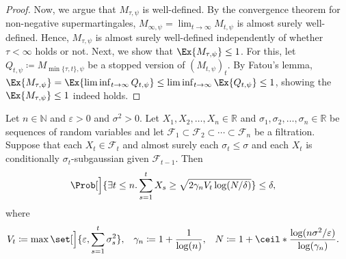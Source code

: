 \documentclass{article}
\newcommand{\defeq}{\coloneq}
\newcommand{\Real}{\mathds{R}}
\newcommand{\Nat}{\mathds{N}}
\DeclarePairedDelimiter{\ceil}\lceil\rceil
\begin{document}
\begin{lemma}
\begin{proof}
    Now, we argue that $M_{\tau,\psi}$ is well-defined.  By the
    convergence theorem for non-negative supermartingales,
    $M_{\infty,\psi} = \lim_{t\to\infty}M_{t,\psi}$ is almost surely
    well-defined.  Hence, $M_{\tau,\psi}$ is almost surely
    well-defined independently of whether $\tau<\infty$ holds or not.
    Next, we show that $\Ex{M_{\tau,\psi}} \le 1$.  For this, let
    $Q_{t,\psi} \defeq M_{\min\{\tau,t\},\psi}$ be a stopped
    version of ${(M_{t,\psi})}_t$.  By Fatou's lemma,
    $\Ex{M_{\tau,\psi}} = \Ex{\liminf_{t\to\infty}Q_{t,\psi}} \le
    \liminf_{t\to\infty}\Ex{Q_{t,\psi}} \le 1$, showing the
    $\Ex{M_{\tau,\psi}} \le 1$ indeed holds.
  \end{proof}
\end{lemma}

\begin{lemma}
  Let $n\in\Nat$ and $\varepsilon>0$ and $\sigma^2>0$.  Let
  $X_1,X_2,\dotsc,X_n\in\Real$ and
  $\sigma_1,\sigma_2,\dotsc,\sigma_n\in\Real$ be sequences of random
  variables and let
  $\mathcal{F}_1 \subset \mathcal{F}_2 \subset \dotsb \subset
  \mathcal{F}_n$ be a filtration.  Suppose that each
  $X_t\in\mathcal{F}_t$ and almost surely each $\sigma_t \le \sigma$
  and each $X_t$ is conditionally $\sigma_t$-subgaussian given
  $\mathcal{F}_{t-1}$.  Then
  \begin{align*}
    \Prob[\Big]{\exists t \le n. \sum_{s=1}^t X_s \ge
    \sqrt{2\gamma_nV_t\log(N/\delta)}}
    &\le \delta,
  \end{align*}
  where
  \begin{align*}
    V_t &\defeq \max\set[\Big]{\varepsilon,\sum_{s=1}^t \sigma_s^2}, &
    \gamma_n &\defeq 1 + \frac{1}{\log(n)}, &
    N &\defeq 1 + \ceil*{\frac{\log(n\sigma^2/\varepsilon)}{\log(\gamma_n)}}.
  \end{align*}


\end{lemma}
\end{document}
